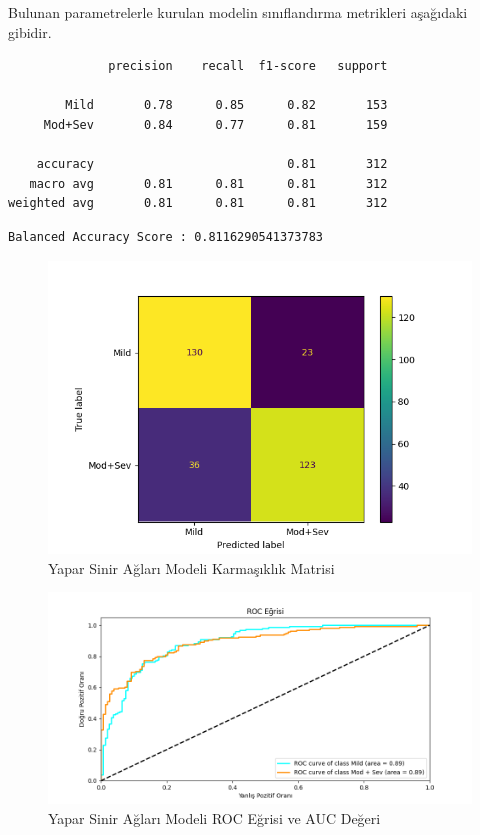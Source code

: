 \documentclass[12pt,twoside]{deuthesis}
\begin{document}
Bulunan parametrelerle kurulan modelin sınıflandırma metrikleri aşağıdaki gibidir.
\begin{verbatim}
              precision    recall  f1-score   support

        Mild       0.78      0.85      0.82       153
     Mod+Sev       0.84      0.77      0.81       159

    accuracy                           0.81       312
   macro avg       0.81      0.81      0.81       312
weighted avg       0.81      0.81      0.81       312
\end{verbatim}
\begin{verbatim}
Balanced Accuracy Score : 0.8116290541373783
\end{verbatim}
\begin{figure}

{\centering \includegraphics[width=1.05\linewidth,height=0.6\textheight]{figure/nn_bin_conf} 

}

\caption{Yapar Sinir Ağları Modeli Karmaşıklık Matrisi}\label{fig:unnamed-chunk-76}
\end{figure}
\begin{figure}

{\centering \includegraphics[width=1.05\linewidth,height=0.6\textheight]{figure/MLPClassifier_binary_roc} 

}

\caption{Yapar Sinir Ağları Modeli ROC Eğrisi ve AUC Değeri}\label{fig:unnamed-chunk-77}
\end{figure}
\end{document}
